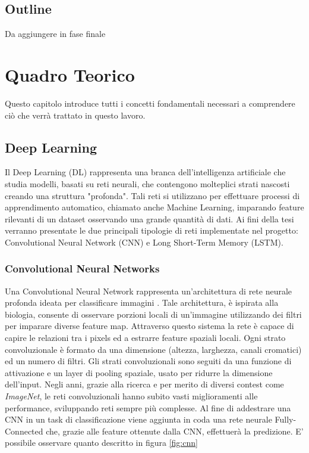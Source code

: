 \documentclass[11pt]{report}
\begin{document}
\section{Outline}

Da aggiungere in fase finale

\chapter{Quadro Teorico}

Questo capitolo introduce tutti i concetti fondamentali necessari a comprendere ciò che verrà trattato in questo lavoro. 


\section{Deep Learning}

Il Deep Learning (DL) rappresenta una branca dell'intelligenza artificiale che studia modelli, basati su reti neurali, che contengono molteplici strati nascosti creando una struttura "profonda". Tali reti si utilizzano per effettuare processi di apprendimento automatico, chiamato anche Machine Learning, imparando feature rilevanti di un dataset osservando una grande quantità di dati. Ai fini della tesi verranno presentate le due principali tipologie di reti implementate nel progetto: Convolutional Neural Network (CNN) e Long Short-Term Memory (LSTM).


\subsection{Convolutional Neural Networks}
Una Convolutional Neural Network rappresenta un'architettura di rete neurale profonda ideata per classificare immagini \cite{krizhevsky2012imagenet}. Tale architettura, è ispirata alla biologia, consente di osservare porzioni locali di un'immagine utilizzando dei filtri per imparare diverse feature map. Attraverso questo sistema la rete è capace di capire le relazioni tra i pixels ed a estrarre feature spaziali locali. Ogni strato convoluzionale è formato da una dimensione (altezza, larghezza, canali cromatici) ed un numero di filtri. Gli strati convoluzionali sono seguiti da una funzione di attivazione e un layer di pooling spaziale, usato per ridurre la dimensione dell'input. Negli anni, grazie alla ricerca e per merito di diversi contest come \textit{ImageNet}, le reti convoluzionali hanno subito vasti miglioramenti alle performance, sviluppando reti sempre più complesse. Al fine di addestrare una CNN in un task di classificazione viene aggiunta in coda una rete neurale Fully-Connected che, grazie alle feature ottenute dalla CNN, effettuerà la predizione.  E' possibile osservare quanto descritto in figura \ref{fig:cnn}
\end{document}
